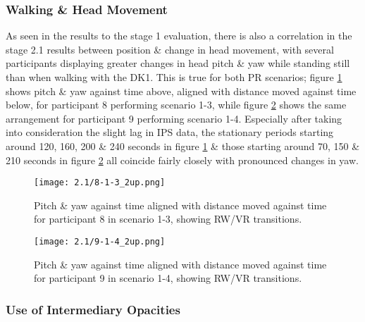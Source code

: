 \subsubsection{Walking \& Head Movement}

As seen in the results to the stage 1 evaluation, there is also a correlation in the stage 2.1 results between position \& change in head movement, with several participants displaying greater changes in head pitch \& yaw while standing still than when walking with the DK1. This is true for both PR scenarios; figure \ref{8-1-3_2up.png} shows pitch \& yaw against time above, aligned with distance moved against time below, for participant 8 performing scenario 1-3, while figure \ref{9-1-4_2up.png} shows the same arrangement for participant 9 performing scenario 1-4. Especially after taking into consideration the slight lag in IPS data, the stationary periods starting around 120, 160, 200 \& 240 seconds in figure \ref{8-1-3_2up.png} \& those starting around 70, 150 \& 210 seconds in figure \ref{9-1-4_2up.png} all coincide fairly closely with pronounced changes in yaw.

\begin{figure}[h]
	\begin{center}
	\texttt{[image: 2.1/8-1-3\_2up.png]}
	\caption{Pitch \& yaw against time aligned with distance moved against time for participant 8 in scenario 1-3, showing RW/VR transitions.}
	\label{8-1-3_2up.png}
	\end{center}
\end{figure}

\begin{figure}[h]
	\begin{center}
	\texttt{[image: 2.1/9-1-4\_2up.png]}
	\caption{Pitch \& yaw against time aligned with distance moved against time for participant 9 in scenario 1-4, showing RW/VR transitions.}
	\label{9-1-4_2up.png}
	\end{center}
\end{figure}


\subsubsection{Use of Intermediary Opacities}

